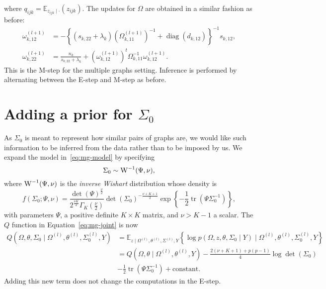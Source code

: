 \documentclass[a4paper, 11pt, oneside]{report}
\DeclareMathOperator{\tr}{tr}
\DeclareMathOperator{\diag}{diag}
\newcommand{\E}{\mathbb{E}}
\newcommand{\1}{\mathds{1}}
\newcommand{\powl}{^{(l)}}
\newcommand{\inv}{^{-1}}
\begin{document}
where $q_{ijk} = \E_{z_{ijk} \mid \cdot}(z_{ijk})$.
The updates for $\Omega$ are obtained in a similar fashion as before:
\begin{align*}
	\omega_{k,12}^{(l+1)}  & = -\left\{(s_{k, 22} + \lambda_k) \left(\Omega_{k, 11}^{(l+1)}\right)\inv + \diag(d_{k, 12})\right\}\inv s_{k, 12},  \\
	\omega_{k, 22}^{(l+1)} & = \frac{n_k}{s_{k,22} + \lambda_k} + \left(\omega_{k,12}^{(l+1)}\right)^t \Omega_{k, 11}\inv \omega_{k, 12}^{(l+1)}.
\end{align*}
This is the M-step for the multiple graphs setting. Inference is performed by
alternating between the E-step and M-step as before.

\section{Adding a prior for $\Sigma_0$} %
As $\Sigma_0$ is meant to represent how similar pairs of graphs are,
we would like such information to be inferred from the data rather than to be imposed by us.
We expand the model in~\eqref{eq:mg-model} by specifying
\[\Sigma_0 \sim \textsc{W}\inv(\Psi, \nu),\]
where $\textsc{W}\inv(\Psi, \nu)$ is the \emph{inverse Wishart} distribution whose density is
\[f(\Sigma_0; \Psi, \nu) = \frac{\det(\Psi)^\frac{\nu}{2}}{2^\frac{\nu K}{2} \Gamma_K(\frac{\nu}{2})} \det(\Sigma_0)^{-\frac{\nu + K + 1}{2}} \exp\left\{-\frac{1}{2} \tr(\Psi \Sigma_0\inv)\right\},\]
with parameters $\Psi$, a positive definite $K \times K$ matrix, and $\nu > K - 1$ a scalar.
The $Q$ function in Equation~\eqref{eq:mg-joint} is now
\begin{align*}
	Q\left(\Omega, \theta, \Sigma_0 \mid \Omega\powl, \theta\powl, \Sigma_0\powl, Y\right) & =  \E_{z \mid \Omega\powl, \theta\powl, \Sigma\powl, Y}\left\{\log p(\Omega,  z, \theta, \Sigma_0 \mid Y) \mid \Omega\powl, \theta\powl, \Sigma_0\powl, Y\right\} \\
	                                                                                       & = Q\left(\Omega, \theta \mid \Omega\powl, \theta\powl, Y\right) - \frac{2(\nu + K + 1) + p(p-1)}{4} \log\det(\Sigma_0)                                            \\
	                                                                                       & - \frac{1}{2} \tr(\Psi \Sigma_0\inv) + \text{constant}.
\end{align*}
Adding this new term does not change the computations in the E-step. %
\end{document}

